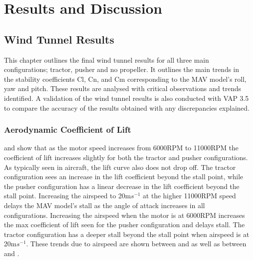 \graphicspath{{./Figs/}}

\chapter{Results and Discussion} 

\section{Wind Tunnel Results}
This chapter outlines the final wind tunnel results for all three main configurations; tractor, pusher and no propeller. It outlines the main trends in the stability coefficients Cl, Cn, and Cm corresponding to the MAV model's roll, yaw and pitch. These results are analysed with critical observations and trends identified. A validation of the wind tunnel results is also conducted with VAP 3.5 to compare the accuracy of the results obtained with any discrepancies explained.



\subsection{Aerodynamic Coefficient of Lift}
 and  show that as the motor speed increases from 6000RPM to 11000RPM the coefficient of lift increases slightly for both the tractor and pusher configurations. As typically seen in aircraft, the lift curve also does not drop off. The tractor configuration sees an increase in the lift coefficient beyond the stall point, while the pusher configuration has a linear decrease in the lift coefficient beyond the stall point. Increasing the airspeed to 20m$s^{-1}$ at the higher 11000RPM speed delays the MAV model's stall as the angle of attack increases in all configurations. Increasing the airspeed when the motor is at 6000RPM increases the max coefficient of lift seen for the pusher configuration  and delays stall. The tractor configuration has a deeper stall beyond the stall point when airspeed is at 20m$s^{-1}$. These trends due to airspeed are shown between  and  as well as between  and .

